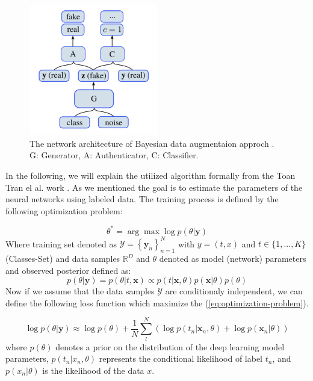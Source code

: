 \begin{figure}
  \centering
  \label{fig:bayesian-approach-gan-architecture}
  \includegraphics[width=0.5\textwidth]{fig/bayesian-approach-gan-architecture}
  \caption{The network architecture of Bayesian data augmentaion approch \cite{bayesian_approach}. G: Generator, A: Authenticator, C: Classifier.}
\end{figure}

In the following, we will explain the utilized algorithm formally from the Toan Tran el al. work \cite{bayesian_approach}. As we mentioned the goal is to estimate the parameters of the neural networks using labeled data. The training process is defined by the following optimization problem:

\begin{equation} \label{eq:optimization-problem}
  \theta^{*}=\arg \max \log p(\theta | \mathbf{y})
\end{equation}
Where training set denoted as $\mathcal{Y}=\left\{\mathbf{y}_{n}\right\}_{n=1}^{N}$ with $y=(t,x)$
and $t\in\{1, ..., K\}$ (Classes-Set) and data samples $\mathbb{R}^D$ and $\theta$ denoted as
model (network) parameters and observed posterior defined as:
\begin{equation} \label{eq:observed-posterior}
  p(\theta | \mathbf{y})=p(\theta | t, \mathbf{x}) \propto p(t | \mathbf{x}, \theta) p(\mathbf{x} | \theta) p(\theta)
\end{equation}
Now if we assume that the data samples $\mathcal{Y}$ are conditionaly independent, we can define the
following loss function which maximize the (\ref{eq:optimization-problem}).

\begin{equation} \label{eq:loss-function}
  \log p(\theta | \mathbf{y}) \approx \log p(\theta)+\frac{1}{N} \sum_{l}^{N}\left(\log p\left(t_{n} | \mathbf{x}_{n}, \theta\right)+\log p\left(\mathbf{x}_{n} | \theta\right)\right)
\end{equation}
where $p(\theta)$ denotes a prior on the distribution of the deep learning model parameters, $p(t_n|x_n, \theta)$
represents the conditional likelihood of label $t_n$, and $p(x_n|\theta)$ is the likelihood of the
data $x$.

